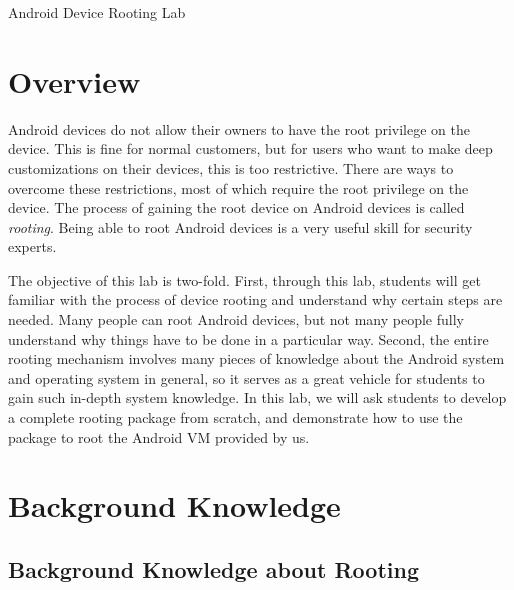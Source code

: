 


\newcommand{\rootingFigs}{./Figs}





\begin{center}
{\LARGE Android Device Rooting Lab}
\end{center}




\section{Overview}

Android devices do not allow their owners to have the root privilege on the
device. This is fine for normal customers, but for users who want to make
deep customizations on their devices, this is too restrictive. There are
ways to overcome these restrictions, most of which require the root
privilege on the device. The process of gaining the root device on Android
devices is called \textit{rooting}. Being able to root Android devices is a
very useful skill for security experts. 


The objective of this lab is two-fold. First, through this lab, students
will get familiar with the process of device rooting and understand why
certain steps are needed. Many people can root Android devices, but not
many people fully understand why things have to be done in a particular
way. Second, the entire rooting mechanism involves
many pieces of knowledge about the Android system and operating system in
general, so it serves as a great vehicle for students to gain such in-depth
system knowledge. In this lab, we will ask students to develop a complete rooting
package from scratch, and demonstrate how to use the package to root the
Android VM provided by us. 


\section{Background Knowledge}


\subsection{Background Knowledge about Rooting}

